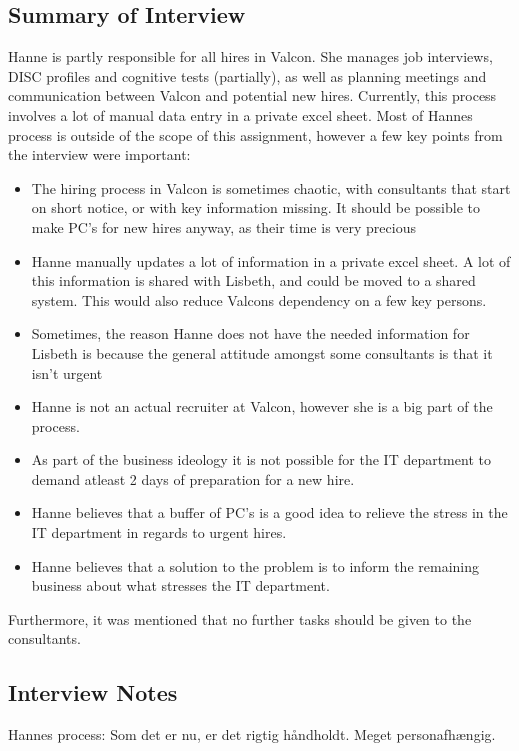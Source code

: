 \label{app:hanne_interview}
\begin{linenumbers*}
\subsection{Summary of Interview}
Hanne is partly responsible for all hires in Valcon. She manages job interviews, DISC profiles and cognitive tests (partially), as well as planning meetings and communication between Valcon and potential new hires. \newline
Currently, this process involves a lot of manual data entry in a private excel sheet. 
Most of Hannes process is outside of the scope of this assignment, however a few key points from the interview were important:
\begin{itemize}
	\item{The hiring process in Valcon is sometimes chaotic, with consultants that start on short notice, or with key information missing. It should be possible to make PC's for new hires anyway, as their time is very precious}
	\item{Hanne manually updates a lot of information in a private excel sheet. A lot of this information is shared with Lisbeth, and could be moved to a shared system. This would also reduce Valcons dependency on a few key persons.}
	\item{Sometimes, the reason Hanne does not have the needed information for Lisbeth is because the general attitude amongst some consultants is that it isn't urgent}
	\item Hanne is not an actual recruiter at Valcon, however she is a big part of the process.
	\item As part of the business ideology it is not possible for the IT department to demand atleast 2 days of preparation for a new hire.
	\item Hanne believes that a buffer of PC's is a good idea to relieve the stress in the IT department in regards to urgent hires.
	\item Hanne believes that a solution to the problem is to inform the remaining business about what stresses the IT department.
\end{itemize}
Furthermore, it was mentioned that no further tasks should be given to the consultants.

\subsection{Interview Notes}
Hannes process:
Som det er nu, er det rigtig håndholdt. Meget personafhængig. 


\end{linenumbers*}
